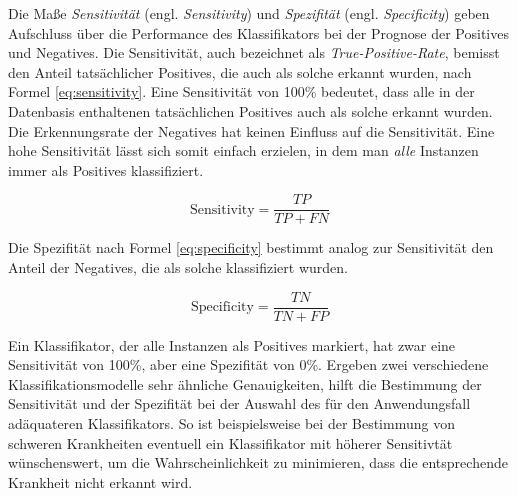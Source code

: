Die Maße \emph{Sensitivität} (engl. \emph{Sensitivity}) und  \emph{Spezifität} (engl. \emph{Specificity}) geben Aufschluss über die Performance des Klassifikators bei der Prognose der Positives und Negatives. Die Sensitivität, auch bezeichnet als \emph{True-Positive-Rate}, bemisst den Anteil tatsächlicher Positives, die auch als solche erkannt wurden, nach Formel \ref{eq:sensitivity}. Eine Sensitivität von 100\% bedeutet, dass alle in der Datenbasis enthaltenen tatsächlichen Positives auch als solche erkannt  wurden. Die Erkennungsrate der Negatives hat keinen Einfluss auf die Sensitivität. Eine hohe Sensitivität lässt sich somit \glqq einfach\grqq{} erzielen, in dem man \emph{alle} Instanzen immer als Positives klassifiziert.\cite[S. 222]{machine_kubat}

\begin{equation}
\text{Sensitivity} = \frac{TP}{TP+FN}
\label{eq:sensitivity}
\end{equation}

Die Spezifität nach Formel \ref{eq:specificity} bestimmt analog zur Sensitivität den Anteil der Negatives, die als solche klassifiziert wurden. 

\begin{equation}
\text{Specificity} = \frac{TN}{TN+FP}
\label{eq:specificity}
\end{equation}

Ein Klassifikator, der alle Instanzen als Positives markiert, hat zwar eine Sensitivität von 100\%, aber eine Spezifität von 0\%. Ergeben zwei verschiedene Klassifikationsmodelle sehr ähnliche Genauigkeiten, hilft die Bestimmung der Sensitivität und der Spezifität bei der Auswahl des für den Anwendungsfall adäquateren Klassifikators. So ist beispielsweise bei der Bestimmung von schweren Krankheiten eventuell ein Klassifikator mit höherer Sensitivtät wünschenswert, um die Wahrscheinlichkeit zu minimieren, dass die entsprechende Krankheit nicht erkannt wird. \cite{sens-and_spec}  \cite[S. 222]{machine_kubat}

